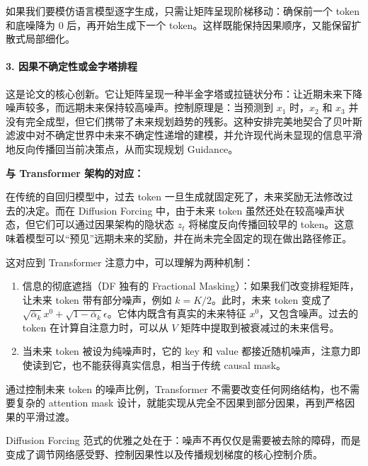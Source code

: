 如果我们要模仿语言模型逐字生成，只需让矩阵呈现阶梯移动：确保前一个 token 和底噪降为 0 后，再开始生成下一个 token。这样既能保持因果顺序，又能保留扩散式局部细化。

\hypertarget{ux56e0ux679cux4e0dux786eux5b9aux6027ux6216ux91d1ux5b57ux5854ux6392ux7a0b}{%
\paragraph{3. 因果不确定性或金字塔排程}\label{ux56e0ux679cux4e0dux786eux5b9aux6027ux6216ux91d1ux5b57ux5854ux6392ux7a0b}}

这是论文的核心创新。它让矩阵呈现一种半金字塔或拉链状分布：让近期未来下降噪声较多，而远期未来保持较高噪声。控制原理是：当预测到 \(x_1\) 时，\(x_2\) 和 \(x_3\) 并没有完全成型，但它们携带了未来规划趋势的残影。这种安排完美地契合了贝叶斯滤波中对不确定世界中未来不确定性递增的建模，并允许现代尚未显现的信息平滑地反向传播回当前决策点，从而实现规划 Guidance。

\textbf{与 Transformer 架构的对应：}

在传统的自回归模型中，过去 token 一旦生成就固定死了，未来奖励无法修改过去的决定。而在 Diffusion Forcing 中，由于未来 token 虽然还处在较高噪声状态，但它们可以通过因果架构的隐状态 \(z_t\) 将梯度反向传播回较早的 token。这意味着模型可以``预见''远期未来的奖励，并在尚未完全固定的现在做出路径修正。

这对应到 Transformer 注意力中，可以理解为两种机制：

\begin{enumerate}
\def\labelenumi{\arabic{enumi}.}
\tightlist
\item
  信息的彻底遮挡（DF 独有的 Fractional Masking）：如果我们改变排程矩阵，让未来 token 带有部分噪声，例如 \(k=K/2\)。此时，未来 token 变成了 \(\sqrt{\bar{\alpha}_k}x^0+\sqrt{1-\bar{\alpha}_k}\epsilon\)。它体内既含有真实的未来特征 \(x^0\)，又包含噪声。过去的 token 在计算自注意力时，可以从 \(V\) 矩阵中提取到被衰减过的未来信号。
\item
  当未来 token 被设为纯噪声时，它的 key 和 value 都接近随机噪声，注意力即使读到它，也不能获得真实信息，相当于传统 causal mask。
\end{enumerate}

通过控制未来 token 的噪声比例，Transformer 不需要改变任何网络结构，也不需要复杂的 attention mask 设计，就能实现从完全不因果到部分因果，再到严格因果的平滑过渡。

Diffusion Forcing 范式的优雅之处在于：噪声不再仅仅是需要被去除的障碍，而是变成了调节网络感受野、控制因果性以及传播规划梯度的核心控制介质。

